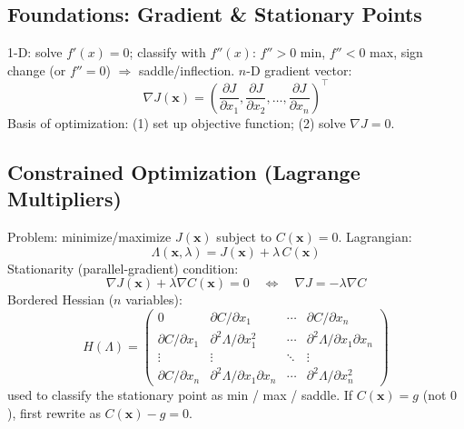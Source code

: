 \subsection{Foundations: Gradient \& Stationary Points}
\begin{formulabox}
1-D: solve $f'(x)=0$; classify with $f''(x)$: $f''>0$ min, $f''<0$ max, sign change (or $f''=0$) $\Rightarrow$ saddle/inflection.
$n$-D gradient vector:
\[
\nabla J(\mathbf x) = \left(\frac{\partial J}{\partial x_1}, \frac{\partial J}{\partial x_2}, \dots, \frac{\partial J}{\partial x_n}\right)^{\!\top}
\]
Basis of optimization: (1) set up objective function; (2) solve $\nabla J = 0$.
\end{formulabox}

\subsection{Constrained Optimization (Lagrange Multipliers)}
\begin{formulabox}
Problem: minimize/maximize $J(\mathbf x)$ subject to $C(\mathbf x)=0$. Lagrangian:
\[
\Lambda(\mathbf x,\lambda) = J(\mathbf x) + \lambda\, C(\mathbf x)
\]
Stationarity (parallel-gradient) condition:
\[
\nabla J(\mathbf x) + \lambda \nabla C(\mathbf x) = 0 \quad\Longleftrightarrow\quad \nabla J = -\lambda \nabla C
\]
Bordered Hessian ($n$ variables):
\[
H(\Lambda) =
\begin{pmatrix}
0 & \partial C/\partial x_1 & \cdots & \partial C/\partial x_n \\
\partial C/\partial x_1 & \partial^2\Lambda/\partial x_1^2 & \cdots & \partial^2\Lambda/\partial x_1\partial x_n \\
\vdots & \vdots & \ddots & \vdots \\
\partial C/\partial x_n & \partial^2 \Lambda/\partial x_1\partial x_n & \cdots & \partial^2\Lambda/\partial x_n^2
\end{pmatrix}
\]
used to classify the stationary point as min / max / saddle. If $C(\mathbf x)=g$ (not $0$), first rewrite as $C(\mathbf x) - g = 0$.
\end{formulabox}
